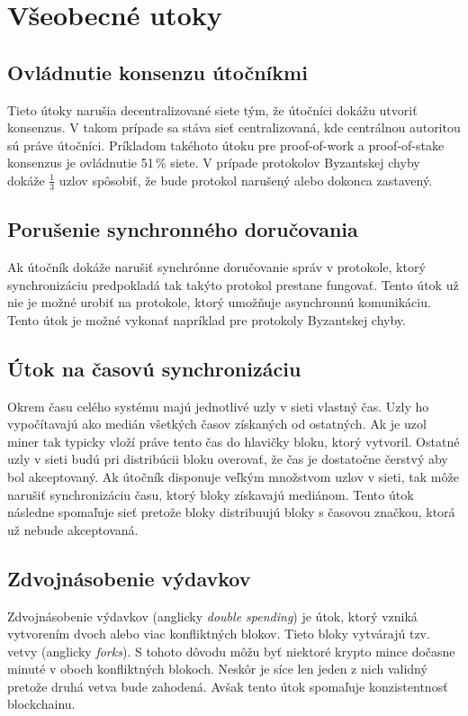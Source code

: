 \section{Všeobecné utoky}

\subsection{Ovládnutie konsenzu útočníkmi}
Tieto útoky narušia decentralizované siete tým, že útočníci dokážu utvoriť konsenzus. V takom prípade sa stáva sieť centralizovaná, kde centrálnou autoritou sú práve útočníci. Príkladom takéhoto útoku pre proof-of-work a proof-of-stake konsenzus je ovládnutie 51\,\% siete. V prípade protokolov Byzantskej chyby dokáže $\frac{1}{3}$ uzlov spôsobiť, že bude protokol narušený alebo dokonca zastavený.~\cite{homoliakBlockchain}

\subsection{Porušenie synchronného doručovania}

Ak útočník dokáže narušiť synchrónne doručovanie správ v protokole, ktorý synchronizáciu predpokladá tak takýto protokol prestane fungovať. Tento útok už nie je možné urobiť na protokole, ktorý umožňuje asynchronnú komunikáciu. Tento útok je možné vykonať napríklad pre protokoly Byzantskej chyby.~\cite{homoliakBlockchain}

\subsection{Útok na časovú synchronizáciu}
Okrem času celého systému majú jednotlivé uzly v sieti vlastný čas. Uzly ho vypočítavajú ako medián všetkých časov získaných od ostatných. Ak je uzol miner tak typicky vloží práve tento čas do hlavičky bloku, ktorý vytvoril. Ostatné uzly v sieti budú pri distribúcii bloku overovať, že čas je dostatočne čerstvý aby bol akceptovaný. Ak útočník disponuje veľkým množstvom uzlov v sieti, tak môže narušiť synchronizáciu času, ktorý bloky získavajú mediánom. Tento útok následne spomaľuje sieť pretože bloky distribuujú bloky s časovou značkou, ktorá už nebude akceptovaná.

\subsection{Zdvojnásobenie výdavkov}

Zdvojnásobenie výdavkov (anglicky \textit{double spending}) je útok, ktorý vzniká vytvorením dvoch alebo viac konfliktných blokov. Tieto bloky vytvárajú tzv. vetvy (anglicky \textit{forks}). S tohoto dôvodu môžu byť niektoré krypto mince dočasne minuté v oboch konfliktných blokoch. Neskôr je síce len jeden z nich validný pretože druhá vetva bude zahodená. Avšak tento útok spomaľuje konzistentnosť blockchainu.

